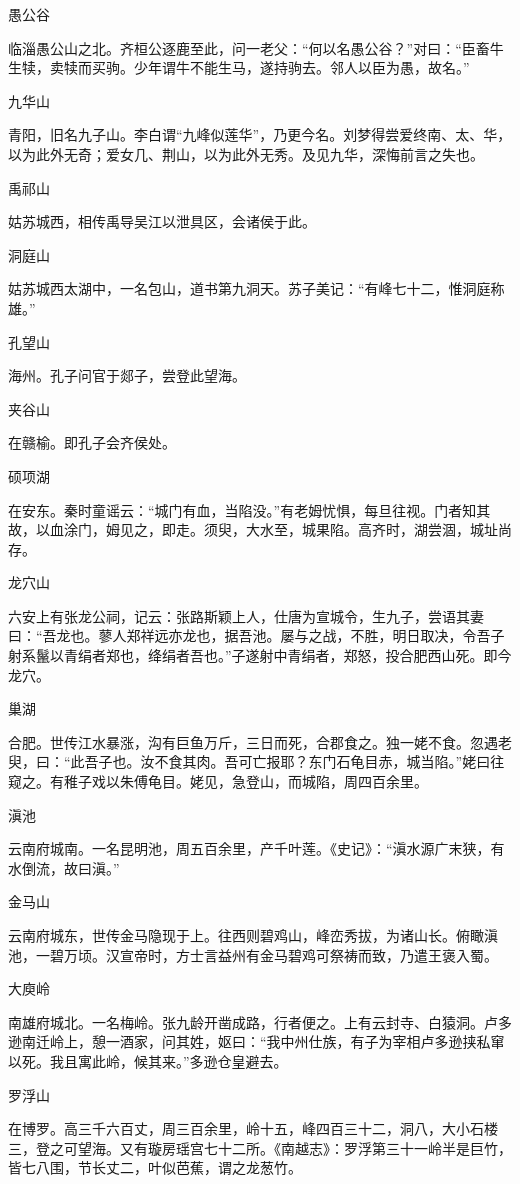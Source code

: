 \documentclass[a4paper,12pt,UTF8,twoside]{ctexbook}
\begin{document}
愚公谷

临淄愚公山之北。齐桓公逐鹿至此，问一老父：“何以名愚公谷？”对曰：“臣畜牛生犊，卖犊而买驹。少年谓牛不能生马，遂持驹去。邻人以臣为愚，故名。”

九华山

青阳，旧名九子山。李白谓“九峰似莲华”，乃更今名。刘梦得尝爱终南、太、华，以为此外无奇；爱女几、荆山，以为此外无秀。及见九华，深悔前言之失也。

禹祁山

姑苏城西，相传禹导吴江以泄具区，会诸侯于此。

洞庭山

姑苏城西太湖中，一名包山，道书第九洞天。苏子美记：“有峰七十二，惟洞庭称雄。”

孔望山

海州。孔子问官于郯子，尝登此望海。

夹谷山

在赣榆。即孔子会齐侯处。

硕项湖

在安东。秦时童谣云：“城门有血，当陷没。”有老姆忧惧，每旦往视。门者知其故，以血涂门，姆见之，即走。须臾，大水至，城果陷。高齐时，湖尝涸，城址尚存。

龙穴山

六安上有张龙公祠，记云：张路斯颖上人，仕唐为宣城令，生九子，尝语其妻曰：“吾龙也。蓼人郑祥远亦龙也，据吾池。屡与之战，不胜，明日取决，令吾子射系鬣以青绢者郑也，绛绢者吾也。”子遂射中青绢者，郑怒，投合肥西山死。即今龙穴。

巢湖

合肥。世传江水暴涨，沟有巨鱼万斤，三日而死，合郡食之。独一姥不食。忽遇老臾，曰：“此吾子也。汝不食其肉。吾可亡报耶？东门石龟目赤，城当陷。”姥曰往窥之。有稚子戏以朱傅龟目。姥见，急登山，而城陷，周四百余里。

滇池

云南府城南。一名昆明池，周五百余里，产千叶莲。《史记》：“滇水源广末狭，有水倒流，故曰滇。”

金马山

云南府城东，世传金马隐现于上。往西则碧鸡山，峰峦秀拔，为诸山长。俯瞰滇池，一碧万顷。汉宣帝时，方士言益州有金马碧鸡可祭祷而致，乃遣王褒入蜀。

大庾岭

南雄府城北。一名梅岭。张九龄开凿成路，行者便之。上有云封寺、白猿洞。卢多逊南迁岭上，憩一酒家，问其姓，妪曰：“我中州仕族，有子为宰相卢多逊挟私窜以死。我且寓此岭，候其来。”多逊仓皇避去。

罗浮山

在博罗。高三千六百丈，周三百余里，岭十五，峰四百三十二，洞八，大小石楼三，登之可望海。又有璇房瑶宫七十二所。《南越志》：罗浮第三十一岭半是巨竹，皆七八围，节长丈二，叶似芭蕉，谓之龙葱竹。
\end{document}
